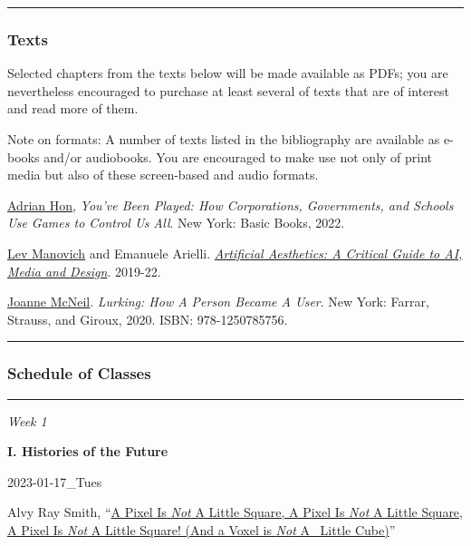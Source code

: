 \documentclass[
  letterpaper,
  DIV=11,
  numbers=noendperiod]{scrartcl}
\begin{document}
\begin{center}\rule{0.5\linewidth}{0.5pt}\end{center}

\hypertarget{texts}{%
\subsubsection{Texts}\label{texts}}

Selected chapters from the texts below will be made available as PDFs;
you are nevertheless encouraged to purchase at least several of texts
that are of interest and read more of them.

Note on formats: A number of texts listed in the bibliography are
available as e-books and/or audiobooks. You are encouraged to make use
not only of print media but also of these screen-based and audio
formats.

\href{https://mssv.net/}{Adrian Hon}, \emph{You've Been Played: How
Corporations, Governments, and Schools Use Games to Control Us All}. New
York: Basic Books, 2022.

\href{https://manovich.net/}{Lev Manovich} and Emanuele Arielli.
\href{http://manovich.net/index.php/projects/artificial-aesthetics-book}{\emph{Artificial
Aesthetics: A Critical Guide to AI, Media and Design}}. 2019-22.

\href{https://joannemcneil.com/}{Joanne McNeil}. \emph{Lurking: How A
Person Became A User}. New York: Farrar, Strauss, and Giroux, 2020.
ISBN: 978-1250785756.

\begin{center}\rule{0.5\linewidth}{0.5pt}\end{center}

\hypertarget{schedule-of-classes}{%
\subsubsection{Schedule of Classes}\label{schedule-of-classes}}

\begin{center}\rule{0.5\linewidth}{0.5pt}\end{center}

\emph{Week 1}

\textbf{I. Histories of the Future}

2023-01-17\_Tues

Alvy Ray Smith,
``\href{https://canvas.emerson.edu/courses/1932613/files/144544398?wrap=1}{A
Pixel Is \emph{Not} A Little Square, A Pixel Is \emph{Not} A Little
Square, A Pixel Is \emph{Not} A Little Square! (And a Voxel is
\emph{Not} A~ Little Cube)}''
\end{document}
